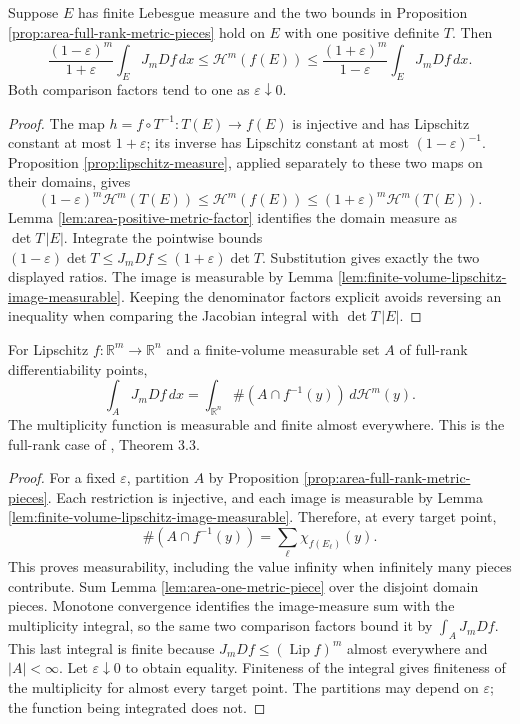 \begin{lemma}\label{lem:area-one-metric-piece}
Suppose $E$ has finite Lebesgue measure and the two bounds in Proposition \ref{prop:area-full-rank-metric-pieces} hold on $E$ with one positive definite $T$. Then
\[
 \frac{(1-\varepsilon)^m}{1+\varepsilon}\int_EJ_mDf\,dx
 \leq\mathcal H^m(f(E))
 \leq\frac{(1+\varepsilon)^m}{1-\varepsilon}\int_EJ_mDf\,dx.
\]
Both comparison factors tend to one as $\varepsilon\downarrow0$.
\end{lemma}
\begin{proof}
The map $h=f\circ T^{-1}:T(E)\to f(E)$ is injective and has Lipschitz constant at most $1+\varepsilon$; its inverse has Lipschitz constant at most $(1-\varepsilon)^{-1}$. Proposition \ref{prop:lipschitz-measure}, applied separately to these two maps on their domains, gives
\[
 (1-\varepsilon)^m\mathcal H^m(T(E))
 \leq\mathcal H^m(f(E))
 \leq(1+\varepsilon)^m\mathcal H^m(T(E)).
\]
Lemma \ref{lem:area-positive-metric-factor} identifies the domain measure as $\det T\,|E|$. Integrate the pointwise bounds $(1-\varepsilon)\det T\leq J_mDf\leq(1+\varepsilon)\det T$. Substitution gives exactly the two displayed ratios. The image is measurable by Lemma \ref{lem:finite-volume-lipschitz-image-measurable}. Keeping the denominator factors explicit avoids reversing an inequality when comparing the Jacobian integral with $\det T\,|E|$.
\end{proof}

\begin{proposition}\label{prop:area-full-rank-lipschitz}
For Lipschitz $f:\mathbb R^m\to\mathbb R^n$ and a finite-volume measurable set $A$ of full-rank differentiability points,
\[
 \int_AJ_mDf\,dx
 =\int_{\mathbb R^n}\#(A\cap f^{-1}(y))\,d\mathcal H^m(y).
\]
The multiplicity function is measurable and finite almost everywhere. This is the full-rank case of \cite{Sim18}, Theorem 3.3.
\end{proposition}
\begin{proof}
For a fixed $\varepsilon$, partition $A$ by Proposition \ref{prop:area-full-rank-metric-pieces}. Each restriction is injective, and each image is measurable by Lemma \ref{lem:finite-volume-lipschitz-image-measurable}. Therefore, at every target point,
\[
 \#(A\cap f^{-1}(y))=\sum_\ell\chi_{f(E_\ell)}(y).
\]
This proves measurability, including the value infinity when infinitely many pieces contribute. Sum Lemma \ref{lem:area-one-metric-piece} over the disjoint domain pieces. Monotone convergence identifies the image-measure sum with the multiplicity integral, so the same two comparison factors bound it by $\int_AJ_mDf$. This last integral is finite because $J_mDf\leq(\operatorname{Lip}f)^m$ almost everywhere and $|A|<\infty$. Let $\varepsilon\downarrow0$ to obtain equality. Finiteness of the integral gives finiteness of the multiplicity for almost every target point. The partitions may depend on $\varepsilon$; the function being integrated does not.
\end{proof}

